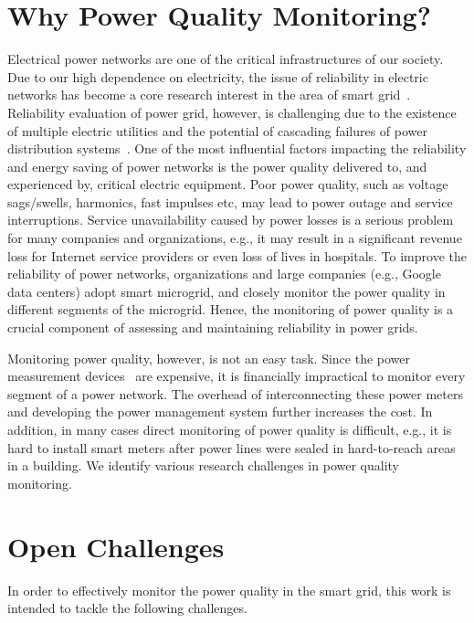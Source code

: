 \label{chapter:introduction}
\section{Why Power Quality Monitoring?}
Electrical power networks are one of the critical infrastructures of our society. Due to our high dependence on electricity, the issue of reliability in electric networks has become a core research interest in the area of smart grid~\cite{Moslehim10}. Reliability evaluation of power grid, however, is challenging due to the existence of multiple electric utilities and the potential of cascading failures of power distribution systems~\cite{Albert04, chen2010cascading, lopez2011challenges, parandehgheibi2014mitigating}. One of the most influential factors impacting the reliability and energy saving of power networks is the power quality delivered to, and experienced by, critical electric equipment. Poor power quality, such as voltage sags/swells, harmonics, fast impulses etc, may lead to power outage and service interruptions. Service unavailability caused by power losses is a serious problem for many companies and organizations, e.g., it may result in a significant revenue loss for Internet service providers or even loss of lives in hospitals. To improve the reliability of power networks, organizations and large companies (e.g., Google data centers) adopt smart microgrid, and closely monitor the power quality in different segments of the microgrid. Hence, the monitoring of power quality is a crucial component of assessing and maintaining reliability in power grids.

Monitoring power quality, however, is not an easy task. Since the power measurement devices~\cite{fluke_meter, schneider_meter} are expensive, it is financially impractical to monitor every segment of a power network. The overhead of interconnecting these power meters and developing the power management system further increases the cost. In addition, in many cases direct monitoring of power quality is difficult, e.g., it is hard to install smart meters after power lines were sealed in hard-to-reach areas in a building. We identify various research challenges in power quality monitoring.

\section{Open Challenges}
In order to effectively monitor the power quality in the smart grid, this work is intended to tackle the following challenges.

